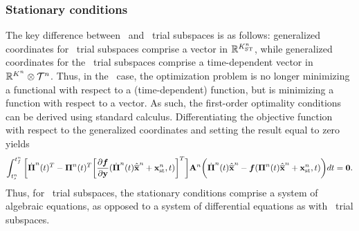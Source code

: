 \subsubsection{Stationary conditions} 
The key difference between \spaceTimeAcronym\ and \spatialAcronym\ trial
	subspaces is as follows: generalized coordinates for \spaceTimeAcronym\ trial subspaces 
	comprise a vector in $\mathbb{R}^{K_{\text{ST}}^{n}}$, while generalized coordinates for
	the \spatialAcronym\ trial subspaces comprise a
	time-dependent vector in
	$\mathbb{R}^{K^{n}} \otimes \mathcal{T}^{n}$. 
Thus, in the \spaceTimeAcronym\ case, the optimization problem is no longer
	minimizing a functional with respect to a (time-dependent) function, but is minimizing a function with 
respect to a vector.  As such, the first-order optimality conditions can be
	derived using standard calculus. Differentiating the objective function with respect
	to the generalized coordinates and setting the result equal to zero yields 
\begin{equation}\label{eq:st_stationary}
 \int_{t_s^{n}}^{t_f^{n}} \bigg[ \dot{\boldsymbol \Pi}^{n}(t)^T  - \boldsymbol \Pi^{n}(t)^T \bigg[\frac{\partial
\boldsymbol f}{\partial \mathbf{y}} (\dot{\boldsymbol \Pi}^{n}(t) \hat{\mathbf{\overline{x}}}^{n} +                    
\mathbf{x}_\text{st}^{n},t)\bigg]^T  \bigg] \mathbf{A}^{n} \bigg( \dot{\boldsymbol \Pi}^{n}(t) \hat{\mathbf{\overline{x}}}^{n}  - \boldsymbol f (\boldsymbol \Pi^{n}(t) \hat{\mathbf{\overline{x}}}^{n} + \mathbf{x}_\text{st}^{n},t) \bigg) dt = \boldsymbol 0.\end{equation}
Thus, for \spaceTimeAcronym\ trial subspaces, the stationary conditions
	comprise a system of algebraic equations, as opposed to a system of
	differential equations as with \spatialAcronym\ trial subspaces.
